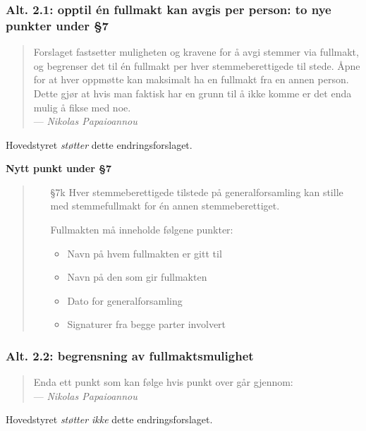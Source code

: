 \documentclass[10pt,norsk,a4paper]{article}
\begin{document}
\subsubsection{Alt. 2.1: opptil én fullmakt kan avgis per person: to nye punkter under §7\label{sec:full}}

\begin{quote}
	Forslaget fastsetter muligheten og kravene for å avgi stemmer via fullmakt,
	og begrenser det til én fullmakt per hver stemmeberettigede til stede.
	Åpne for at hver oppmøtte kan maksimalt ha en fullmakt fra en annen person.
	Dette gjør at hvis man faktisk har en grunn til å ikke komme er det enda mulig å fikse med noe.\\
	--- \emph{Nikolas Papaioannou}
\end{quote}

Hovedstyret \emph{støtter} dette endringsforslaget.

\textbf{Nytt punkt under §7}


\begin{quote}
    \begin{enumerate}
        \item[§7k]
            Hver stemmeberettigede tilstede på generalforsamling kan stille med
            stemmefullmakt for én annen stemmeberettiget.

            Fullmakten må inneholde følgene punkter:
            \begin{itemize}
                \item Navn på hvem fullmakten er gitt til
                \item Navn på den som gir fullmakten
                \item Dato for generalforsamling
                \item Signaturer fra begge parter involvert
            \end{itemize}
    \end{enumerate}
\end{quote}

\subsubsection{Alt. 2.2: begrensning av fullmaktsmulighet\label{sec:begrenset_full}}
\begin{quote}
	Enda ett punkt som kan følge hvis punkt over går gjennom:\\
	--- \emph{Nikolas Papaioannou}
\end{quote}
Hovedstyret \emph{støtter ikke} dette endringsforslaget.
\end{document}

